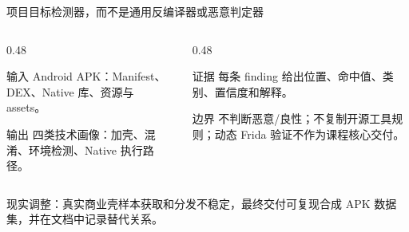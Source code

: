 \documentclass[10pt,aspectratio=169]{beamer}
\begin{document}
\begin{frame}{项目目标}{检测器，而不是通用反编译器或恶意判定器}
  \begin{columns}[T,totalwidth=\textwidth]
    \begin{column}{0.48\textwidth}
      \begin{block}{输入}
        Android APK：Manifest、DEX、Native 库、资源与 assets。
      \end{block}
      \begin{block}{输出}
        四类技术画像：加壳、混淆、环境检测、Native 执行路径。
      \end{block}
    \end{column}
    \begin{column}{0.48\textwidth}
      \begin{block}{证据}
        每条 finding 给出位置、命中值、类别、置信度和解释。
      \end{block}
      \begin{block}{边界}
        不判断恶意/良性；不复制开源工具规则；动态 Frida 验证不作为课程核心交付。
      \end{block}
    \end{column}
  \end{columns}
  \vspace{0.5em}
  现实调整：真实商业壳样本获取和分发不稳定，最终交付可复现合成 APK 数据集，并在文档中记录替代关系。
\end{frame}
\end{document}

